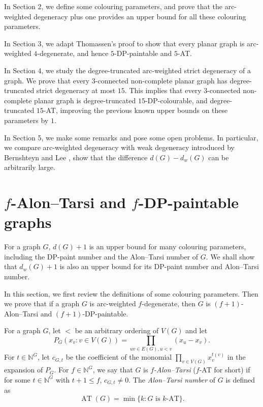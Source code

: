 \documentclass[11pt,a4paper]{article}
\theoremstyle{definition}
\begin{document}
In Section 2, we define some colouring parameters, and prove that the arc-weighted degeneracy plus one provides an upper bound for all these colouring parameters. 

In Section 3, we adapt Thomassen's proof to show that every planar graph is arc-weighted $4$-degenerate, and hence $5$-DP-paintable and $5$-AT.

In Section 4, we study the degree-truncated arc-weighted strict degeneracy of a graph. We prove that every 3-connected non-complete planar graph has degree-truncated strict degeneracy at most $15$. This implies that every 3-connected non-complete planar graph is degree-truncated $15$-DP-colourable, and degree-truncated $15$-AT, improving the previous known upper bounds on these parameters by $1$. 

In Section 5, we make some remarks and pose some open problems. In particular, we compare arc-weighted degeneracy with weak degeneracy introduced by Bernshteyn and Lee \cite{BL}, show that the difference $d(G) - d_{w}(G) $ can be arbitrarily large. 



    
	
	\section{ $f$-Alon--Tarsi and  $f$-DP-paintable  graphs} 
    \label{f-AT-and-f-DP-paintable}
	For a graph $G$, $d(G)+1$  is an upper bound for many colouring parameters, including the DP-paint number and the Alon--Tarsi number of $G$. We shall show that   $d_{w}(G)+1$ is also an upper bound for its DP-paint number and Alon--Tarsi number.



	 In this section, we first review the definitions of some colouring parameters. Then we prove that if a graph $G$ is arc-weighted $f$-degenerate, then $G$ is $(f+1)$-Alon--Tarsi and  $(f+1)$-DP-paintable. 
      
 

For a graph $G$, let $<$ be an arbitrary ordering of $V(G)$ and let $$P_G(x_v: v \in V(G)) = \prod_{uv \in E(G), u< v}(x_u-x_v).$$
For $t \in \mathbb{N}^G$, let $c_{G,t}$ be the coefficient of the monomial $\prod_{v \in V(G)}x_v^{t(v)}$ in the expansion of $P_G$. For $f \in \mathbb{N}^G$, we say that $G$ is {\em $f$-Alon--Tarsi} ($f$-AT for short) if for some $t \in \mathbb{N}^G$ with $t+1  \le f$, $c_{G,t} \ne 0$. The {\em Alon--Tarsi number} of $G$ is defined as 
$$\operatorname{AT}(G)=\min\{k: G \text{ is $k$-AT}\}.$$
\end{document}
